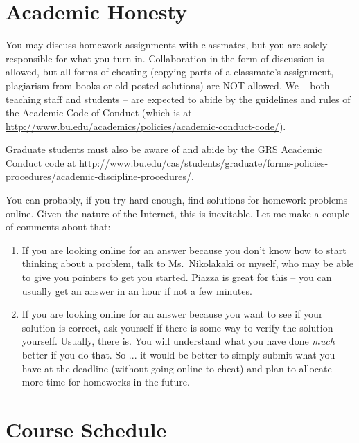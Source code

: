 \documentclass[11pt]{article}
\begin{document}
\newpage

\section*{Academic Honesty}

You may discuss homework assignments with classmates, but you are 
solely responsible for what you turn in. Collaboration in the form of
discussion is allowed, but all forms of cheating (copying parts of a
classmate's assignment, plagiarism from books or old posted solutions)
are NOT allowed. We -- both teaching staff and students -- are expected
to abide by the guidelines and rules of the Academic Code of Conduct
(which is at
\url{http://www.bu.edu/academics/policies/academic-conduct-code/}).

Graduate students must also be aware of and abide by the GRS Academic
Conduct code at \url{http://www.bu.edu/cas/students/graduate/forms-policies-procedures/academic-discipline-procedures/}.

You can probably, if you try hard enough, find solutions for homework
problems online.    Given the nature of the Internet, this is
inevitable.   Let me make a couple of comments about that:
\begin{enumerate}
\item If you are looking online for an answer because you don't know how
  to start thinking about a problem, talk to Ms.\ Nikolakaki or myself, who may be
  able to give you pointers to get you started.  Piazza is great for
  this -- you can usually get an answer in an hour if not a few minutes.
\item If you are looking online for an answer because you want to see if
  your solution is correct, ask yourself if there is some way to verify
  the solution yourself.   Usually, there is.  You will understand what you have done
  \emph{much} better if you do that.
So ... it would be better to simply submit what you have at the deadline
(without going online to cheat) and plan to allocate more time for
homeworks in the future.
\end{enumerate}

\newpage
\section*{Course Schedule}
\end{document}
